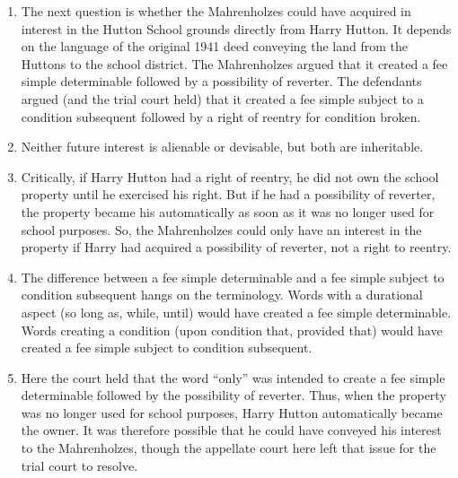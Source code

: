\begin{enumerate}
    school board is in dispute. It depends on how the court interprets the 
    language in the conveyance. But the only two possible future interests 
    that could have been created are (1) a possibility of reverter or (2) a 
    right of reentry. Neither of these future interests are transferable 
    inter vivos under Illinois law, so ``the trial court correctly ruled that 
    the plaintiffs could not have acquired any interest in that property from 
    the Jacqmains by the deed of October 9, 1959.''\footnote{Casebook p. 227.}
    \item The next question is whether the Mahrenholzes could have acquired in 
    interest in the Hutton School grounds directly from Harry Hutton. It 
    depends on the language of the original 1941 deed conveying the land from 
    the Huttons to the school district. The Mahrenholzes argued that it 
    created a fee simple determinable followed by a possibility of reverter. 
    The defendants argued (and the trial court held) that it created a fee 
    simple subject to a condition subsequent followed by a right of reentry 
    for condition broken.
    \item Neither future interest is alienable or devisable, but both are 
    inheritable.
    \item Critically, if Harry Hutton had a right of reentry, he did not own 
    the school property until he exercised his right. But if he had a 
    possibility of reverter, the property became his automatically as soon as 
    it was no longer used for school purposes. So, the Mahrenholzes could only 
    have an interest in the property if Harry had acquired a possibility of 
    reverter, not a right to reentry.
    \item The difference between a fee simple determinable and a fee simple 
    subject to condition subsequent hangs on the terminology. Words with a 
    durational aspect (so long as, while, until) would have created a fee 
    simple determinable. Words creating a condition (upon condition that, 
    provided that) would have created a fee simple subject to condition 
    subsequent.
    \item Here the court held that the word ``only'' was intended to create a 
    fee simple determinable followed by the possibility of reverter. Thus, 
    when the property was no longer used for school purposes, Harry Hutton 
    automatically became the owner. It was therefore possible that he could 
    have conveyed his interest to the Mahrenholzes, though the appellate court 
    here left that issue for the trial court to resolve.
\end{enumerate}

